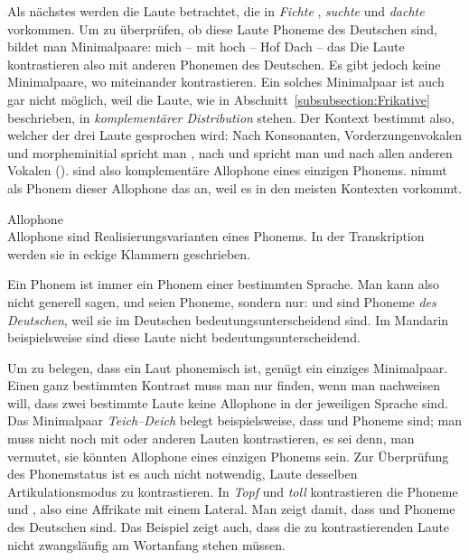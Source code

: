 Als nächstes werden die Laute \textipa{[\c{c}, x, X]} betrachtet, die in \textit{Fichte} \textipa{[\textprimstress fI\c{c}.t@]}, \textit{suchte} \textipa{[\textprimstress zu:x.t@]} und \textit{dachte}  vorkommen. Um zu überprüfen, ob diese Laute Phoneme des Deutschen sind, bildet man Minimalpaare:
\ea
\ea mich \textipa{[mI\c{c}]} -- mit \textipa{[mIt]}
\ex hoch \textipa{[ho:x]} -- Hof \textipa{[ho:f]}
\ex Dach \textipa{[daX]} -- das \textipa{[das]}
\z
\z
Die Laute kontrastieren also mit anderen Phonemen des Deutschen. Es gibt jedoch keine Minimalpaare, wo \textipa{[\c{c}, x, X]} miteinander kontrastieren. Ein solches Minimalpaar ist auch gar nicht möglich, weil die Laute, wie in Abschnitt~\ref{subsubsection:Frikative} beschrieben, in \textit{komplementärer Distribution} stehen. Der Kontext bestimmt also, welcher der drei Laute gesprochen wird: Nach Konsonanten, Vorderzungenvokalen und morpheminitial spricht man \textipa{[\c{c}]}, nach  und  spricht man \textipa{[x]} und nach allen anderen Vokalen \textipa{[X]} (\citet[192]{Pompino-Marschall2020}). \textipa{[\c{c}, x, X]} sind also komplementäre Allophone eines einzigen Phonems. \citet[63--64]{Hall2000} nimmt als Phonem dieser Allophone das  an, weil es in den meisten Kontexten vorkommt.


\begin{Definition}{Allophone}\\
\noindent
Allophone sind Realisierungsvarianten eines Phonems. In der Transkription werden sie in eckige Klammern geschrieben. 

\end{Definition}


Ein Phonem ist immer ein Phonem einer bestimmten Sprache. Man kann also nicht generell sagen,  und  seien Phoneme, sondern nur:  und  sind Phoneme \textit{des Deutschen}, weil sie im Deutschen bedeutungsunterscheidend sind. Im Mandarin beispielsweise sind diese Laute nicht bedeutungsunterscheidend.

Um zu belegen, dass ein Laut phonemisch ist, genügt ein einziges Minimalpaar. Einen ganz bestimmten Kontrast muss man nur finden, wenn man nachweisen will, dass zwei bestimmte Laute keine Allophone in der jeweiligen Sprache sind. Das Minimalpaar \textit{Teich--Deich} belegt beispielsweise, dass  und  Phoneme sind; man muss  nicht noch mit  oder anderen Lauten kontrastieren, es sei denn, man vermutet, sie könnten Allophone eines einzigen Phonems sein. Zur Überprüfung des Phonemstatus ist es auch nicht notwendig, Laute desselben Artikulationsmodus zu kontrastieren. In \textit{Topf}  und \textit{toll}  kontrastieren die Phoneme  und , also eine Affrikate mit einem Lateral. Man zeigt damit, dass  und  Phoneme des Deutschen sind. Das Beispiel zeigt auch, dass die zu kontrastierenden Laute nicht zwangsläufig am Wortanfang stehen müssen.

